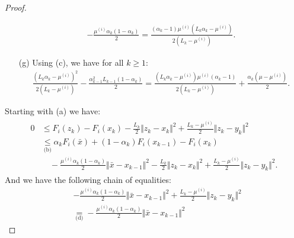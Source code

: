 \documentclass[12pt]{article}
\begin{document}
\begin{proof}
\begin{itemize}
\begin{align*}
                    - \frac{\mu^{(i)}\alpha_k(1 - \alpha_k)}{2}
                    = \frac{(\alpha_k - 1)\mu^{(i)}\left(L_k\alpha_k - \mu^{(i)}\right)}
                    {2\left(L_k - \mu^{(i)}\right)}. 
                \end{align*}
                \item [(g)] Using (c), we have for all $k \ge 1$: 
                \begin{align*}
                    \frac{\left(
                        L_k\alpha_k - \mu^{(i)}
                    \right)^2}{2(L_k - \mu^{(i)})} 
                    -
                    \frac{\alpha_{k - 1}^2L_{k - 1}(1 - \alpha_k)}{2} 
                    = 
                    \frac{
                        \left(L_k \alpha_k - \mu^{(i)}\right)\mu^{(i)}
                        \left(\alpha_k - 1\right)
                    }
                    {2(L_k - \mu^{(i)})}
                    + \frac{\alpha_k(\mu - \mu^{(i)})}{2}. 
                \end{align*}
            \end{itemize}
            Starting with (a) we have: 
            \begin{align}\label{ineq:snapg2-one-step-chain1}
                \begin{split}
                    0 &\le F_i(z_k) - F_i(x_k) - \frac{L_k}{2}\Vert z_k - x_k\Vert^2 + \frac{L_k - \mu^{(i)}}{2}\Vert z_k - y_k\Vert^2
                    \\
                    &\underset{\text{(b)}}{\le}
                    \alpha_k F_i(\bar x) + (1 - \alpha_k)F_i(x_{k - 1}) - F_i(x_k) \\
                        &\quad 
                        - \frac{\mu^{(i)}\alpha_k(1 - \alpha_k)}{2}\Vert \bar x - x_{k - 1}\Vert^2
                        - \frac{L_k}{2}\Vert z_k - x_k\Vert^2 
                        + \frac{L_k - \mu^{(i)}}{2}\Vert z_k - y_k\Vert^2. 
                \end{split}
            \end{align}
            And we have the following chain of equalities:
            {\allowdisplaybreaks
            \begin{align*}
                & - \frac{\mu^{(i)}\alpha_k(1 - \alpha_k)}{2}\Vert \bar x - x_{k - 1}\Vert^2
                + \frac{L_k - \mu^{(i)}}{2}\Vert z_k - y_k\Vert^2
                \\
                &\underset{\text{(d)}}{=}
                - \frac{\mu^{(i)}\alpha_k(1 - \alpha_k)}{2}\Vert \bar x - x_{k - 1}\Vert^2 

\end{align*}}
\end{proof}
\end{document}
